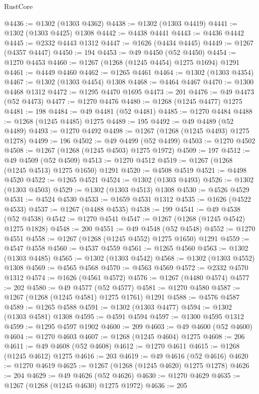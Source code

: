 \begin{lexlean}{RustCore}
\begin{coremodule}
@4436 := @1302 (@1303 @4362)
@4438 := @1302 (@1303 @4419)
@4441 := @1302 (@1303 @4425) @1308
@4442 := @4438 @4441
@4443 := @4436 @4442
@4445 := @2332 @4443 @1312
@4447 := @1626 (@4434 @4445)
@4449 := @1267 (@4357 @4447)
@4450 := 194
@4453 := @49 @4450 (@52 @4450)
@4454 := @1270 @4453
@4460 := @1267 (@1268 (@1245 @4454) @1275 @1694) @1291
@4461 := @4449 @4460
@4462 := @1265 @4461
@4464 := @1302 (@1303 @4354)
@4467 := @1302 (@1303 @4454) @1308
@4468 := @4464 @4467
@4470 := @1300 @4468 @1312
@4472 := @1295 @4470 @1695
@4473 := 201
@4476 := @49 @4473 (@52 @4473)
@4477 := @1270 @4476
@4480 := @1268 (@1245 @4477) @1275
@4481 := 198
@4484 := @49 @4481 (@52 @4481)
@4485 := @1270 @4484
@4488 := @1268 (@1245 @4485) @1275
@4489 := 195
@4492 := @49 @4489 (@52 @4489)
@4493 := @1270 @4492
@4498 := @1267 (@1268 (@1245 @4493) @1275 @1278)
@4499 := 196
@4502 := @49 @4499 (@52 @4499)
@4503 := @1270 @4502
@4508 := @1267 (@1268 (@1245 @4503) @1275 @1972)
@4509 := 197
@4512 := @49 @4509 (@52 @4509)
@4513 := @1270 @4512
@4519 := @1267 (@1268 (@1245 @4513) @1275 @1650) @1291
@4520 := @4508 @4519
@4521 := @4498 @4520
@4522 := @1265 @4521
@4524 := @1302 (@1303 @4493)
@4526 := @1302 (@1303 @4503)
@4529 := @1302 (@1303 @4513) @1308
@4530 := @4526 @4529
@4531 := @4524 @4530
@4533 := @1659 @4531 @1312
@4535 := @1626 (@4522 @4533)
@4537 := @1267 (@4488 @4535)
@4538 := 199
@4541 := @49 @4538 (@52 @4538)
@4542 := @1270 @4541
@4547 := @1267 (@1268 (@1245 @4542) @1275 @1828)
@4548 := 200
@4551 := @49 @4548 (@52 @4548)
@4552 := @1270 @4551
@4558 := @1267 (@1268 (@1245 @4552) @1275 @1650) @1291
@4559 := @4547 @4558
@4560 := @4537 @4559
@4561 := @1265 @4560
@4563 := @1302 (@1303 @4485)
@4565 := @1302 (@1303 @4542)
@4568 := @1302 (@1303 @4552) @1308
@4569 := @4565 @4568
@4570 := @4563 @4569
@4572 := @2332 @4570 @1312
@4574 := @1626 (@4561 @4572)
@4576 := @1267 (@4480 @4574)
@4577 := 202
@4580 := @49 @4577 (@52 @4577)
@4581 := @1270 @4580
@4587 := @1267 (@1268 (@1245 @4581) @1275 @1761) @1291
@4588 := @4576 @4587
@4589 := @1265 @4588
@4591 := @1302 (@1303 @4477)
@4594 := @1302 (@1303 @4581) @1308
@4595 := @4591 @4594
@4597 := @1300 @4595 @1312
@4599 := @1295 @4597 @1902
@4600 := 209
@4603 := @49 @4600 (@52 @4600)
@4604 := @1270 @4603
@4607 := @1268 (@1245 @4604) @1275
@4608 := 206
@4611 := @49 @4608 (@52 @4608)
@4612 := @1270 @4611
@4615 := @1268 (@1245 @4612) @1275
@4616 := 203
@4619 := @49 @4616 (@52 @4616)
@4620 := @1270 @4619
@4625 := @1267 (@1268 (@1245 @4620) @1275 @1278)
@4626 := 204
@4629 := @49 @4626 (@52 @4626)
@4630 := @1270 @4629
@4635 := @1267 (@1268 (@1245 @4630) @1275 @1972)
@4636 := 205

\end{coremodule}
\end{lexlean}
